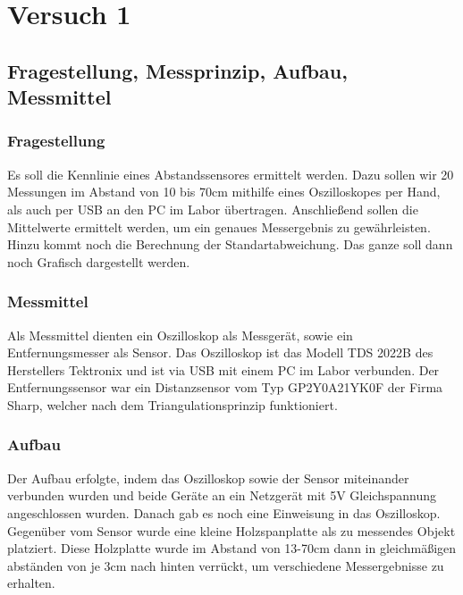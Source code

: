 \documentclass[TGAI_Laborbericht.tex]{subfiles}
\begin{document}
\chapter{Versuch 1}
\label{chap:VERSUCH_1}


\section{Fragestellung, Messprinzip, Aufbau, Messmittel}
\label{chap:VERSUCH_1_FRAGESTELLUNG}

\subsection*{Fragestellung}
Es soll die Kennlinie eines Abstandssensores ermittelt werden. Dazu sollen wir 20 Messungen im Abstand von 10 bis 70cm mithilfe eines Oszilloskopes per Hand, als auch per USB an den PC im Labor übertragen. Anschließend sollen die Mittelwerte ermittelt werden, um ein genaues Messergebnis zu gewährleisten. Hinzu kommt noch die Berechnung der Standartabweichung. Das ganze soll dann noch Grafisch dargestellt werden.

\subsection*{Messmittel}
Als Messmittel dienten ein Oszilloskop als Messgerät, sowie ein Entfernungsmesser als
Sensor. Das Oszilloskop ist das Modell TDS 2022B des Herstellers Tektronix und ist via USB mit einem PC im Labor verbunden. Der Entfernungssensor war ein Distanzsensor vom Typ GP2Y0A21YK0F der
Firma Sharp, welcher nach dem Triangulationsprinzip funktioniert.

\subsection*{Aufbau}
Der Aufbau erfolgte, indem das Oszilloskop sowie der Sensor miteinander verbunden wurden und beide Geräte an ein Netzgerät mit 5V Gleichspannung angeschlossen wurden.
Danach gab es noch eine Einweisung in das Oszilloskop. Gegenüber vom Sensor wurde eine kleine Holzspanplatte als zu messendes Objekt platziert. Diese Holzplatte wurde im Abstand von 13-70cm dann in gleichmäßigen abständen von je 3cm nach hinten verrückt, um verschiedene Messergebnisse zu erhalten.
\end{document}
